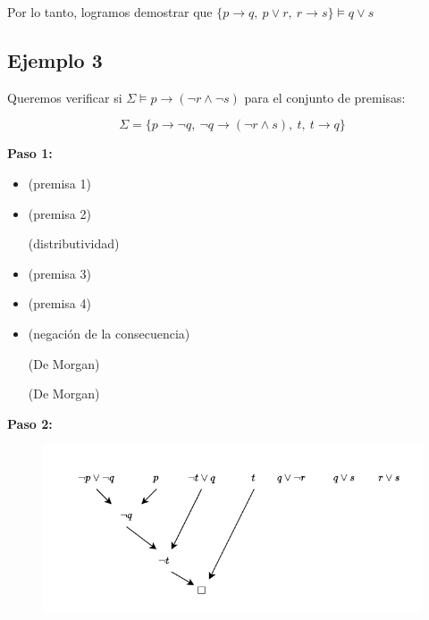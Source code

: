\documentclass{article}
\begin{document}
Por lo tanto, logramos demostrar que $\{p \rightarrow q,\ p \vee r,\ r \rightarrow s\} \vDash q \vee s$


\subsection{Ejemplo 3}

Queremos verificar si $\Sigma \vDash p \rightarrow (\neg r \land \neg s)$
para el conjunto de premisas:

$$\Sigma = \{p \rightarrow \neg q,\ \neg q \rightarrow (\neg r \land s), \ t,\ t\rightarrow q\}$$


\textbf{Paso 1:}
\begin{itemize}
  \item{
        (premisa 1)}

  \item{
        (premisa 2)}

        {
        (distributividad)}


  \item{ (premisa 3)}

  \item{
        (premisa 4)}


  \item{
        (negación de la consecuencia)}

        {
        (De Morgan)}

        {
        (De Morgan)}
\end{itemize}

\textbf{Paso 2:}
\begin{figure}[H]
  \centering
  \includegraphics[width=.8\textwidth]{images/resolucion_03.pdf}
\end{figure}
\end{document}
